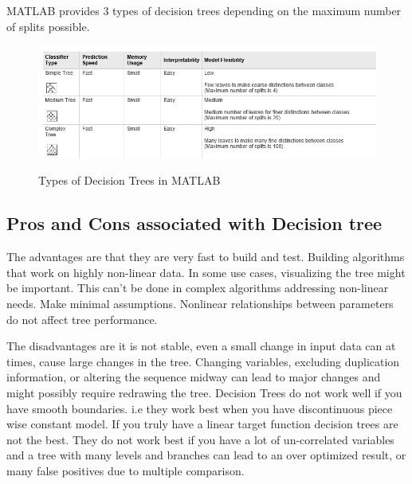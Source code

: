 \noindent MATLAB provides 3 types of decision trees depending on the maximum number of splits possible.


\begin{figure}[H]
\centering
{\includegraphics[scale=0.85]{table.png}}
\caption{Types of Decision Trees in MATLAB}
\end{figure}


\subsection{Pros and Cons associated with Decision tree} \label{Pros and Cons associated with Decision tree}

The advantages are that they are very fast to build and test. Building algorithms that work on highly non-linear data. In some use cases, visualizing the tree might be important. This can't be done in complex algorithms addressing non-linear needs.
Make minimal assumptions. Nonlinear relationships between parameters do not affect tree performance.

The disadvantages are it is not stable, even a small change in input data can at times, cause large changes in the tree. Changing variables, excluding duplication information, or altering the sequence midway can lead to major changes and might possibly require redrawing the tree. Decision Trees do not work well if you have smooth boundaries.  i.e they work best when you have discontinuous piece wise constant model. If you truly have a linear target function decision trees are not the best. They do not work best if you have a lot of un-correlated variables and a tree with many levels and branches can lead to an over optimized result, or many false positives due to multiple comparison.